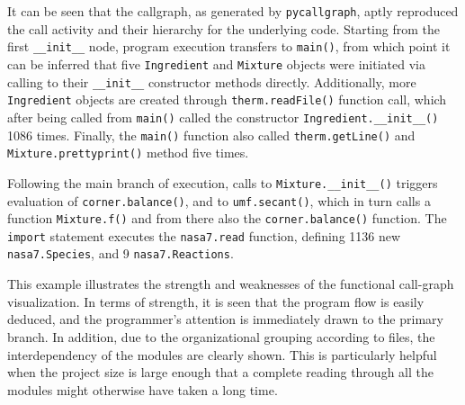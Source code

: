 \documentclass[conference]{IEEEtran}
\begin{document}
It can be seen that the callgraph, as generated by \texttt{pycallgraph}, aptly reproduced the call activity and their hierarchy for the underlying code. Starting from the first \lstinline!__init__! node, program execution transfers to \lstinline!main()!, from which point it can be inferred that five \lstinline!Ingredient! and \lstinline!Mixture! objects were initiated via calling to their \lstinline!__init__! constructor methods directly. Additionally, more \lstinline!Ingredient! objects are created through \lstinline!therm.readFile()! function call, which after being called from \lstinline!main()! called the constructor \lstinline!Ingredient.__init__()! 1086 times. Finally, the \lstinline!main()! function also called \lstinline!therm.getLine()! and \lstinline!Mixture.prettyprint()! method five times.\par

Following the main branch of execution, calls to \lstinline!Mixture.__init__()! triggers evaluation of \lstinline!corner.balance()!, and to \lstinline!umf.secant()!, which in turn calls a function \lstinline!Mixture.f()! and from there also the \lstinline!corner.balance()! function. The \lstinline!import! statement executes the \lstinline!nasa7.read! function, defining 1136 new \lstinline!nasa7.Species!, and 9 \lstinline!nasa7.Reactions!. \par

This example illustrates the strength and weaknesses of the functional call-graph visualization. In terms of strength, it is seen that the program flow is easily deduced, and the programmer's attention is immediately drawn to the primary branch. In addition, due to the organizational grouping according to files, the interdependency of the modules are clearly shown. This is particularly helpful when the project size is large enough that a complete reading through all the modules might otherwise have taken a long time.\par
\end{document}
